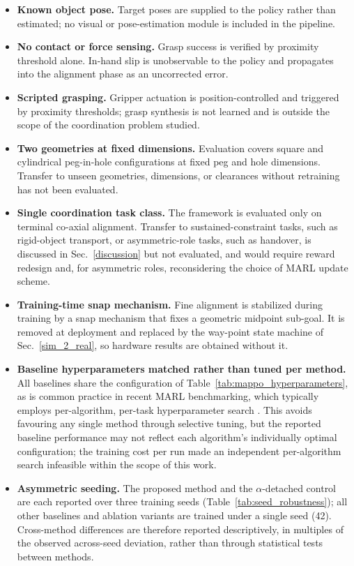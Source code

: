 \documentclass[a4paper,fleqn]{cas-dc}
\begin{document}
\begin{itemize}
\item \textbf{Known object pose.} Target poses are supplied to the policy rather than estimated; no visual or pose-estimation module is included in the pipeline.
\item \textbf{No contact or force sensing.} Grasp success is verified by proximity threshold alone. In-hand slip is unobservable to the policy and propagates into the alignment phase as an uncorrected error.
\item \textbf{Scripted grasping.} Gripper actuation is position-controlled and triggered by proximity thresholds; grasp synthesis is not learned and is outside the scope of the coordination problem studied.
\item \textbf{Two geometries at fixed dimensions.} Evaluation covers square and cylindrical peg-in-hole configurations at fixed peg and hole dimensions. Transfer to unseen geometries, dimensions, or clearances without retraining has not been evaluated.
\item \textbf{Single coordination task class.} The framework is evaluated only on terminal co-axial alignment. Transfer to sustained-constraint tasks, such as rigid-object transport, or asymmetric-role tasks, such as handover, is discussed in Sec.~\ref{discussion} but not evaluated, and would require reward redesign and, for asymmetric roles, reconsidering the choice of MARL update scheme.
\item \textbf{Training-time snap mechanism.} Fine alignment is stabilized during training by a snap mechanism that fixes a geometric midpoint sub-goal. It is removed at deployment and replaced by the way-point state machine of Sec.~\ref{sim_2_real}, so hardware results are obtained without it.
\item \textbf{Baseline hyperparameters matched rather than tuned per method.} All baselines share the configuration of Table~\ref{tab:mappo_hyperparameters}, as is common practice in recent MARL benchmarking, which typically employs per-algorithm, per-task hyperparameter search \cite{xie2026multi}. This avoids favouring any single method through selective tuning, but the reported baseline performance may not reflect each algorithm's individually optimal configuration; the training cost per run made an independent per-algorithm search infeasible within the scope of this work.
\item \textbf{Asymmetric seeding.} The proposed method and the $\alpha$-detached control are each reported over three training seeds (Table~\ref{tab:seed_robustness}); all other baselines and ablation variants are trained under a single seed (42). Cross-method differences are therefore reported descriptively, in multiples of the observed across-seed deviation, rather than through statistical tests between methods.

\end{itemize}
\end{document}
